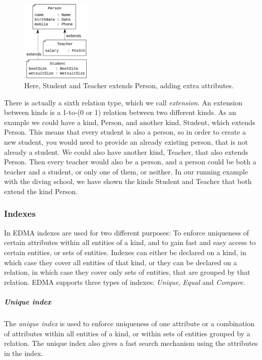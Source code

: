 \begin{figure}
	\vspace{-0.415cm}
	\includegraphics[width=0.3\textwidth]{img/kindExtension.pdf}
	\caption{Here, Student and Teacher extends Person, adding extra attributes.}
\end{figure}

There is actually a sixth relation type, which we call \emph{extension}.
An extension between kinds is a 1-to-(0 or 1) relation between two
different kinds. As an example we could have a kind, Person, and another
kind, Student, which extends Person. This means that every student
is also a person, so in order to create a new student, you would need
to provide an already existing person, that is not already a student.
We could also have another kind, Teacher, that also extends Person.
Then every teacher would also be a person, and a person could be both
a teacher and a student, or only one of them, or neither. In our running
example with the diving school, we have shown the kinds Student and
Teacher that both extend the kind Person.


\subsubsection{Indexes}

In EDMA indexes are used for two different purposes: To enforce uniqueness
of certain attributes within all entities of a kind, and to gain fast
and easy access to certain entities, or sets of entities. Indexes
can either be declared on a kind, in which case they cover all entities
of that kind, or they can be declared on a relation, in which case
they cover only sets of entities, that are grouped by that relation.
EDMA supports three types of indexes: \emph{Unique}, \emph{Equal}
and \emph{Compare}. 


\subparagraph{Unique index}

The \emph{unique index} is used to enforce uniqueness of one attribute
or a combination of attributes within all entities of a kind, or within
sets of entities grouped by a relation. The unique index also gives
a fast search mechanism using the attributes in the index. 

